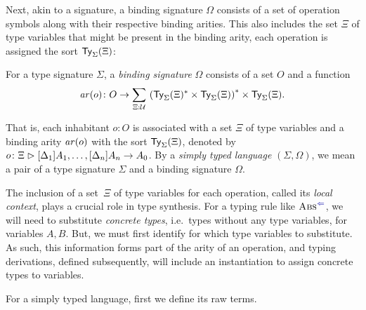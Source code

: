 Next, akin to a signature, a binding signature $\Omega$ consists of a set of operation symbols along with their respective binding arities.
This also includes the set $\Xi$ of type variables that might be present in the binding arity, each operation is assigned the sort $\mathsf{Ty}_{\Sigma}(\Xi)$:
\begin{definition}\label{def:binding-signature}
  For a type signature $\Sigma$, a \emph{binding signature} $\Omega$ consists of a set $O$ and a function
  \[
    \arity(o) \colon O \to \sm{\Xi : \UU} \left(\Type_\Sigma(\Xi)^* \times \Type_\Sigma(\Xi)\right)^* \times \Type_\Sigma(\Xi).
  \]
\end{definition}
That is, each inhabitant $o: O$  is associated with a set $\Xi$ of type variables and a binding arity $\mathit{ar}(o)$ with the sort $\mathsf{Ty}_{\Sigma}(\Xi)$, denoted by $o\colon \Xi \mathrel{\rhd} [\Delta_{1}]A_{1}, \ldots, [\Delta_{n}]A_{n} \to A_0$.
By a \emph{simply typed language} $(\Sigma, \Omega)$, we mean a pair of a type signature $\Sigma$ and a binding signature $\Omega$.

The inclusion of a set~$\Xi$ of type variables for each operation, called its \emph{local context}, plays a crucial role in type synthesis.
For a typing rule like $\ChkRule{Abs}$, we will need to substitute \emph{concrete types}, i.e.\ types without any type variables, for variables $A, B$.
But, we must first identify for which type variables to substitute.
As such, this information forms part of the arity of an operation, and typing derivations, defined subsequently, will include an instantiation to assign concrete types to variables.

For a simply typed language, first we define its raw terms.

